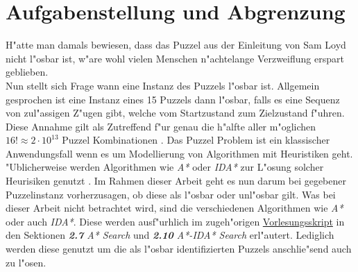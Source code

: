 \section{Aufgabenstellung und Abgrenzung} %
\label{cha:Aufgabenstellung}
H"atte man damals bewiesen, dass das Puzzel aus der Einleitung von Sam Loyd nicht l"osbar ist, w"are wohl vielen Menschen n"achtelange Verzweiflung erspart geblieben.\\
Nun stellt sich Frage wann eine Instanz des Puzzels l"osbar ist. Allgemein gesprochen ist eine Instanz eines 15 Puzzels dann l"osbar, falls es eine Sequenz von zul"assigen Z"ugen gibt, welche vom Startzustand zum Zielzustand f"uhren.\\
Diese Annahme gilt als Zutreffend f"ur genau die h"alfte aller m"oglichen $16! \approx 2 \cdot 10^{13}$ Puzzel Kombinationen \autocite{sliding-piece-puzzels:book,solving-15-puzzle-lvi:article}.
Das Puzzel Problem ist ein klassischer Anwendungsfall wenn es um Modellierung von Algorithmen mit Heuristiken geht. "Ublicherweise werden Algorithmen wie \textit{A*} oder \textit{IDA*} zur L"osung solcher Heurisiken genutzt \autocite{wiki-15-puzzle:online,solving-15-puzzle-lvi:article, depth-first-id:article}.
Im Rahmen dieser Arbeit geht es nun darum bei gegebener Puzzelinstanz vorherzusagen, ob diese als l"osbar oder unl"osbar gilt.
Was bei dieser Arbeit nicht betrachtet wird, sind die verschiedenen Algorithmen wie \textit{A*} oder auch \textit{IDA*}. Diese werden ausf"urhlich im zugeh"origen \textcolor{violet}{\href{https://github.com/karlstroetmann/Artificial-Intelligence/blob/master/Lecture-Notes/artificial-intelligence.pdf}{Vorlesungsskript}} in den Sektionen \textit{\textbf{2.7} A* Search} und \textit{\textbf{2.10} A*-IDA* Search} erl"autert.
Lediglich werden diese genutzt um die als l"osbar identifizierten Puzzels anschlie"send auch zu l"osen.



